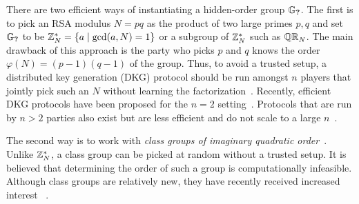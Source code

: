 There are two efficient ways of instantiating a hidden-order group $\mathbb{G}_{\textbf{?}}$.
The first is to pick an RSA modulus $N=pq$ as the product of two large primes $p,q$ and set $\mathbb{G}_{\textbf{?}}$ to be $\mathbb{Z}_N^*=\{a \mid \gcd(a,N)=1\}$ or a subgroup of $\mathbb{Z}_N^*$ such as $\mathbb{QR}_N$.
The main drawback of this approach is the party who picks $p$ and $q$ knows the order $\varphi(N)=(p-1)(q-1)$ of the group.
Thus, to avoid a trusted setup, a distributed key generation (DKG) protocol should be run amongst $n$ players that jointly pick such an $N$ without learning the factorization~\cite{BonehFranklin1997}.
Recently, efficient DKG protocols have been proposed for the $n=2$ setting~\cite{HMRT12,Frederiksen2018}.
Protocols that are run by $n>2$ parties also exist but are less efficient and do not scale to a large $n$~\cite{DM10}.

The second way is to work with \textit{class groups of imaginary quadratic order}~\cite{Buchmann1988,Buchmann2001}.
Unlike $\mathbb{Z}_N^*$, a class group can be picked at random without a trusted setup.
It is believed that determining the order of such a group is computationally infeasible.
Although class groups are relatively new, they have recently received increased interest ~\cite{Damgaard2002,Lipmaa2012,Pietrzak2018,Wesolowski19,BBF19,Boneh2018ASurvey,AltugChen2018}.